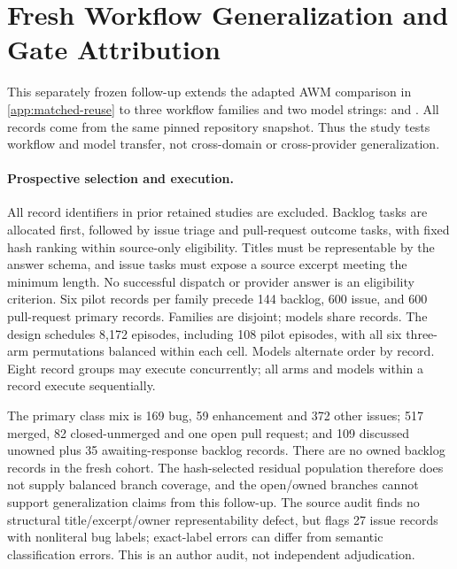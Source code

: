 \section{Fresh Workflow Generalization and Gate Attribution}
\label{app:generalization-gate}

This separately frozen follow-up extends the adapted AWM comparison in
\cref{app:matched-reuse} to three workflow families and two model strings:
 and . All records come from the same pinned
repository snapshot. Thus the study tests workflow and model transfer, not
cross-domain or cross-provider generalization.

\paragraph{Prospective selection and execution.}
All record identifiers in prior retained studies are excluded. Backlog tasks
are allocated first, followed by issue triage and pull-request outcome tasks,
with fixed hash ranking within source-only eligibility. Titles must be
representable by the answer schema, and issue tasks must expose a source
excerpt meeting the minimum length. No successful dispatch or provider answer
is an eligibility criterion. Six pilot records per family precede 144 backlog,
600 issue, and 600 pull-request primary records. Families are disjoint; models
share records. The design schedules 8,172 episodes, including 108 pilot
episodes, with all six three-arm permutations balanced within each cell.
Models alternate order by record. Eight record groups may execute concurrently;
all arms and models within a record execute sequentially.

The primary class mix is 169 bug, 59 enhancement and 372 other issues;
517 merged, 82 closed-unmerged and one open pull request; and 109 discussed
unowned plus 35 awaiting-response backlog records. There are no owned backlog
records in the fresh cohort. The hash-selected residual population therefore
does not supply balanced branch coverage, and the open/owned branches cannot
support generalization claims from this follow-up. The source audit finds no
structural title/excerpt/owner representability defect, but flags 27 issue
records with nonliteral bug labels; exact-label errors can differ from semantic
classification errors. This is an author audit, not independent adjudication.

